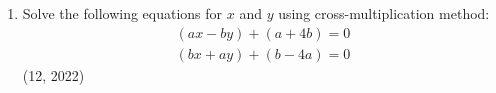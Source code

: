 \begin{enumerate}[label=\thesubsection.\arabic*, ref=\thesubsection.\theenumi]
\item Solve the following equations for $x$ and $y$ using cross-multiplication method:
	\begin{align}
		(ax-by)+(a+4b)=0\\
		(bx+ay)+(b-4a)=0
	\end{align}
\hfill (12, 2022)
\end{enumerate}
